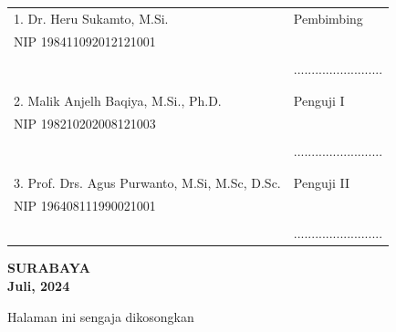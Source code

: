 \begin{center}
\noindent
\begin{tabularx}{\textwidth}{X l}
	1. Dr. Heru Sukamto, M.Si.     & Pembimbing \\
	NIP 198411092012121001       &  \\
	&  \\
	&.........................  \\
	&  \\
	&  \\
	2. Malik Anjelh Baqiya, M.Si., Ph.D.   & Penguji I \\
	NIP 198210202008121003     & \\
        &  \\
	& ......................... \\
        &  \\
	&  \\
	3. Prof. Drs. Agus Purwanto, M.Si, M.Sc, D.Sc.    & Penguji II \\
	NIP 196408111990021001     &  \\
	&  \\
        & .........................\\
\end{tabularx}
\endgroup
  \begin{center}
	\textbf{SURABAYA\\Juli, 2024}
\end{center}
\end{center}

\newpage
\thispagestyle{empty}
\vspace*{\fill}
    \begin{center}
	Halaman ini sengaja dikosongkan
    \end{center}
\vspace*{\fill}
\pagebreak